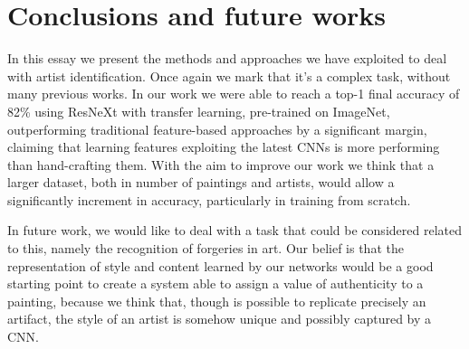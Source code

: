 \documentclass{article}
\begin{document}
\section{Conclusions and future works}\label{conclusions}
In this essay we present the methods and approaches we have exploited to deal with artist identification. Once again we mark that it's a complex task, without many previous works. 
In our work we were able to reach a top-1 final accuracy of 82\% using ResNeXt with transfer learning, pre-trained on ImageNet, outperforming traditional feature-based approaches by a significant margin, claiming that learning features exploiting the latest CNNs is more performing than hand-crafting them. With the aim to improve our work we think that a larger dataset, both in number of paintings and artists, would allow a significantly increment in accuracy, particularly in training from scratch. 

In future work, we would like to deal with a task that could be considered related to this, namely the recognition of forgeries in art. Our belief is that the representation of style and content learned by our networks would be a good starting point to create a system able to assign a value of authenticity to a painting, because we think that, though is possible to replicate precisely an artifact, the style of an artist is somehow unique and possibly captured by a CNN.
\end{document}
